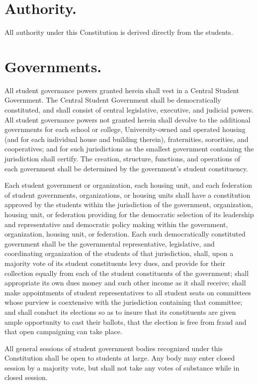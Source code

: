 \section{Authority.}
    All authority under this Constitution is derived directly from the students.

\section{Governments.}
    All student governance powers granted herein shall vest in a Central Student Government. The Central Student Government shall be democratically constituted, and shall consist of central legislative, executive, and judicial powers. All student governance powers not granted herein shall devolve to the additional governments for each school or college, University-owned and operated housing (and for each individual house and building therein), fraternities, sororities, and cooperatives; and for such jurisdictions as the smallest government containing the jurisdiction shall certify. The creation, structure, functions, and operations of each government shall be determined by the government's student constituency.

    Each student government or organization, each housing unit, and each federation of student governments, organizations, or housing units shall have a constitution approved by the students within the jurisdiction of the government, organization, housing unit, or federation providing for the democratic selection of its leadership and representative and democratic policy making within the government, organization, housing unit, or federation. Each such democratically constituted government shall be the governmental representative, legislative, and coordinating organization of the students of that jurisdiction, shall, upon a majority vote of its student constituents levy dues, and provide for their collection equally from each of the student constituents of the government; shall appropriate its own dues money and such other income as it shall receive; shall make appointments of student representatives to all student seats on committees whose purview is coextensive with the jurisdiction containing that committee; and  shall conduct its elections so as to insure that its constituents are given ample opportunity to cast their ballots, that the election is free from fraud and that open campaigning can take place.

    All general sessions of student government bodies recognized under this Constitution shall be open to students at large. Any body may enter closed session by a majority vote, but shall not take any votes of substance while in closed session.
 
